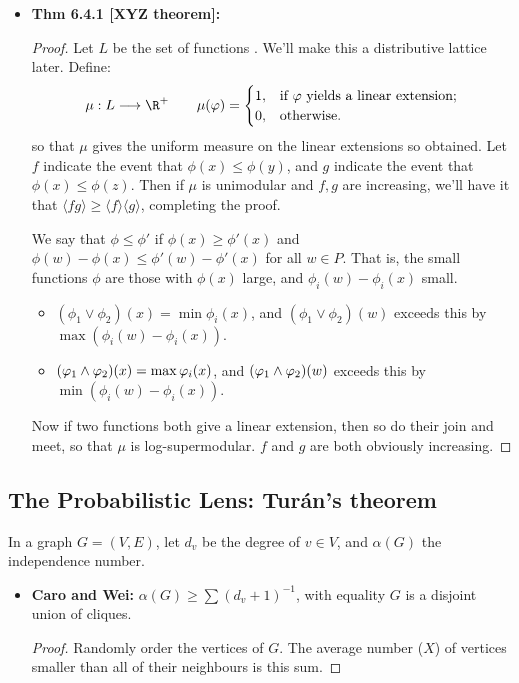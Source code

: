 \documentclass[11pt]{article}
\newenvironment{INT}[1][]{\begin{itemize}\small\item\textbf{#1}}{\end{itemize}}
\begin{document}
\begin{chapter6}
\begin{itemise}
\begin{INT}[Thm 6.4.1 {[XYZ theorem]}:]
\begin{proof}
\INDENT Let $L$ be the set of functions . We'll make this a distributive lattice later. Define:
\[\mu:L\to\R^+\qquad \mu(\phi)=\begin{cases}
1,&\textup{if $\phi$ yields a linear extension};\\
0,&\textup{otherwise}.
\end{cases}\]
so that $\mu$ gives the uniform measure on the linear extensions so obtained. Let $f$ indicate the event that $\phi(x)\leq \phi(y)$, and $g$ indicate the event that $\phi(x)\leq \phi(z)$. Then if $\mu$ is unimodular and $f,g$ are increasing, we'll have it that $\langle fg\rangle\geq\langle f\rangle\langle g\rangle$, completing the proof.

\INDENT %
We say that $\phi\leq\phi'$ if $\phi(x)\geq\phi'(x)$ and $\phi(w)-\phi(x)\leq\phi'(w)-\phi'(x)$ for all $w\in P$. That is, the small functions $\phi$ are those with $\phi(x)$ large, and $\phi_i(w)-\phi_i(x)$ small.
\begin{itemize}\squishlist
\item $(\phi_1\vee\phi_2)(x)=\min\phi_i(x)$, and $(\phi_1\vee\phi_2)(w)$ exceeds this by $\max (\phi_i(w)-\phi_i(x))$.
\item $(\varphi_1\wedge\varphi_2)(x)=\max\varphi_i(x)$, and $(\varphi_1\wedge\varphi_2)(w)$ exceeds this by $\min (\phi_i(w)-\phi_i(x))$.
\end{itemize}
Now if two functions both give a linear extension, then so do their join and meet, so that $\mu$ is log-supermodular. $f$ and $g$ are both obviously increasing.
\end{proof}
\end{INT}
\end{itemise}
\subsection*{The Probabilistic Lens: Tur\'an's theorem}
In a graph $G=(V,E)$, let $d_v$ be the degree of $v\in V$, and $\alpha(G)$ the independence number.
\begin{INT}[Caro and Wei:]
$\alpha(G)\geq\displaystyle\sum(d_v+1)^{-1}$, with equality \Iff $G$ is a disjoint union of cliques.
\begin{proof}
Randomly order the vertices of $G$. The average number ($X$) of vertices smaller than all of their neighbours is this sum.


\end{proof}
\end{INT}
\end{chapter6}
\end{document}
